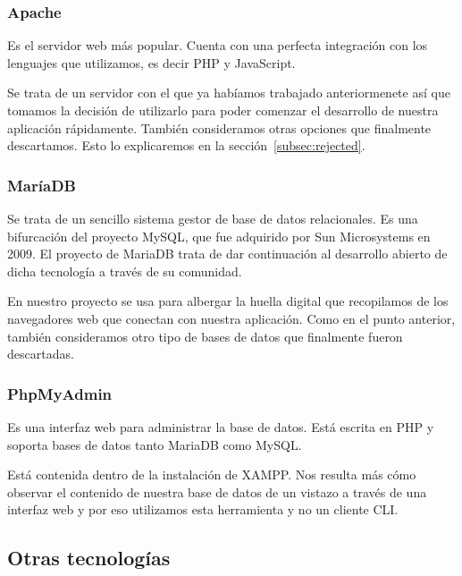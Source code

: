 \subsubsection{Apache}

Es el servidor web más popular. Cuenta con una perfecta integración con los lenguajes que utilizamos, es decir PHP y JavaScript. \par 

Se trata de un servidor con el que ya habíamos trabajado anteriormenete así que tomamos la decisión de utilizarlo para poder comenzar el desarrollo de nuestra aplicación rápidamente. También consideramos otras opciones que finalmente descartamos. Esto lo explicaremos en la sección~\ref{subsec:rejected}. \par 

\subsubsection{MaríaDB}

Se trata de un sencillo sistema gestor de base de datos relacionales. Es una bifurcación del proyecto MySQL, que fue adquirido por Sun Microsystems en 2009. El proyecto de MariaDB trata de dar continuación al desarrollo abierto de dicha tecnología a través de su comunidad. \par 

En nuestro proyecto se usa para albergar la huella digital que recopilamos de los navegadores web que conectan con nuestra aplicación. Como en el punto anterior, también consideramos otro tipo de bases de datos que finalmente fueron descartadas. \par 

\subsubsection{PhpMyAdmin}

Es una interfaz web para administrar la base de datos. Está escrita en PHP y soporta bases de datos tanto MariaDB como MySQL. \par 

Está contenida dentro de la instalación de XAMPP. Nos resulta más cómo observar el contenido de nuestra base de datos de un vistazo a través de una interfaz web y por eso utilizamos esta herramienta y no un cliente CLI. \par 

\subsection{Otras tecnologías}

